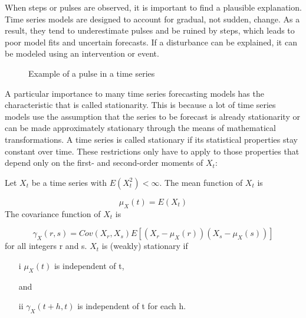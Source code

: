 When steps or pulses are observed, it is important to find a plausible explanation. Time series models are designed to account for gradual, not sudden, change. As a result, they tend to underestimate pulses and be ruined by steps, which leads to poor model fits and uncertain forecasts. If a disturbance can be explained, it can be modeled using an intervention or event. 

\begin{figure}[ht]
	\centering
	\caption{Example of a pulse in a time series}
\end{figure}


A particular importance to many time series forecasting models has the characteristic that is called stationarity. This is because a lot of time series models use the assumption that the series to be forecast is already stationarity or can be made approximately stationary through the means of mathematical transformations. 
A time series is called stationary if its statistical properties stay constant over time. These restrictions only have to apply to those properties that depend only on the first- and second-order moments of \(X_t\):

Let \({X_t}\) be a time series with \(E(X_t^2 ) < \infty\). The mean function of \({X_t }\) is

\begin{equation}\label{eq:mean_function}
	\mu_X(t) = E(X_t )
\end{equation}
The covariance function of \({X_t }\) is

\begin{equation}\label{eq:covariance_function}
	\gamma_X(r, s)  = Cov(X_r,X_s)  E[(X_r - \mu_X(r))(X_s - \mu_X(s))]
\end{equation}
for all integers r and s.
\({X_t }\) is (weakly) stationary if
\begin{enumerate}
\item [i] \(\mu_X(t)\) is independent of t,
\item [and]
\item [ii] \(\gamma_X(t + h, t) \) is independent of t for each h.
\end{enumerate}

